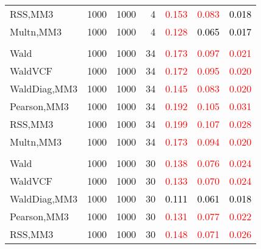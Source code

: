 \documentclass[
]{article}
\begin{document}
\begin{table}[H]
{\begin{tabular}[t]{lrrrrrr}
\hspace{1em}RSS,MM3 & 1000 & 1000 & 4 & \textcolor{red}{0.153} & \textcolor{red}{0.083} & \textcolor{black}{0.018}\\
\hspace{1em}Multn,MM3 & 1000 & 1000 & 4 & \textcolor{red}{0.128} & \textcolor{black}{0.065} & \textcolor{black}{0.017}\\
\addlinespace[0.3em]
\multicolumn{7}{l}{\textbf{1F 15V}}\\
\hspace{1em}Wald & 1000 & 1000 & 34 & \textcolor{red}{0.173} & \textcolor{red}{0.097} & \textcolor{red}{0.021}\\
\hspace{1em}WaldVCF & 1000 & 1000 & 34 & \textcolor{red}{0.172} & \textcolor{red}{0.095} & \textcolor{red}{0.020}\\
\hspace{1em}WaldDiag,MM3 & 1000 & 1000 & 34 & \textcolor{red}{0.145} & \textcolor{red}{0.083} & \textcolor{red}{0.020}\\
\hspace{1em}Pearson,MM3 & 1000 & 1000 & 34 & \textcolor{red}{0.192} & \textcolor{red}{0.105} & \textcolor{red}{0.031}\\
\hspace{1em}RSS,MM3 & 1000 & 1000 & 34 & \textcolor{red}{0.199} & \textcolor{red}{0.107} & \textcolor{red}{0.028}\\
\hspace{1em}Multn,MM3 & 1000 & 1000 & 34 & \textcolor{red}{0.173} & \textcolor{red}{0.094} & \textcolor{red}{0.020}\\
\addlinespace[0.3em]
\multicolumn{7}{l}{\textbf{2F 10V}}\\
\hspace{1em}Wald & 1000 & 1000 & 30 & \textcolor{red}{0.138} & \textcolor{red}{0.076} & \textcolor{red}{0.024}\\
\hspace{1em}WaldVCF & 1000 & 1000 & 30 & \textcolor{red}{0.133} & \textcolor{red}{0.070} & \textcolor{red}{0.024}\\
\hspace{1em}WaldDiag,MM3 & 1000 & 1000 & 30 & \textcolor{black}{0.111} & \textcolor{black}{0.061} & \textcolor{black}{0.018}\\
\hspace{1em}Pearson,MM3 & 1000 & 1000 & 30 & \textcolor{red}{0.131} & \textcolor{red}{0.077} & \textcolor{red}{0.022}\\
\hspace{1em}RSS,MM3 & 1000 & 1000 & 30 & \textcolor{red}{0.148} & \textcolor{red}{0.071} & \textcolor{red}{0.026}\\

\end{tabular}}
\end{table}
\end{document}
